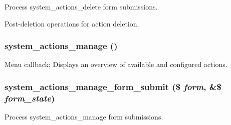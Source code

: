 \label{system_8admin_8inc_ad081e1fe2621d62873254449a097f2e7}
Process system\_\-actions\_\-delete form submissions.

Post-\/deletion operations for action deletion. \hypertarget{system_8admin_8inc_a362aac908fa612bb62c015acc11e308e}{
\subsubsection[{system\_\-actions\_\-manage}]{\setlength{\rightskip}{0pt plus 5cm}system\_\-actions\_\-manage ()}}
\label{system_8admin_8inc_a362aac908fa612bb62c015acc11e308e}
Menu callback; Displays an overview of available and configured actions. \hypertarget{system_8admin_8inc_ab37cd97a32a3723e9af59094d1141951}{
\subsubsection[{system\_\-actions\_\-manage\_\-form\_\-submit}]{\setlength{\rightskip}{0pt plus 5cm}system\_\-actions\_\-manage\_\-form\_\-submit (\$ {\em form}, \/  \&\$ {\em form\_\-state})}}
\label{system_8admin_8inc_ab37cd97a32a3723e9af59094d1141951}
Process system\_\-actions\_\-manage form submissions.

